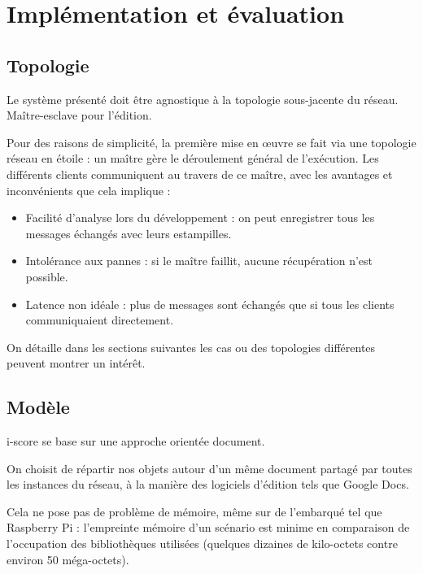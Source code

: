 \documentclass{article}
\begin{document}


\section{Implémentation et évaluation}\label{sec.evaluation}

\subsection{Topologie}
Le système présenté doit être agnostique à la topologie sous-jacente du réseau.
Maître-esclave pour l'édition.

Pour des raisons de simplicité, la première mise en œuvre se fait via une topologie réseau en étoile : un maître gère le déroulement général de l'exécution. 
Les différents clients communiquent au travers de ce maître, avec les avantages et inconvénients que cela implique : 
\begin{itemize}
    \item Facilité d'analyse lors du développement : on peut enregistrer tous les messages échangés avec leurs estampilles.
    \item Intolérance aux pannes : si le maître faillit, aucune récupération n'est possible.
    \item Latence non idéale : plus de messages sont échangés que si tous les clients communiquaient directement.
\end{itemize}

On détaille dans les sections suivantes les cas ou des topologies différentes peuvent montrer un intérêt.



\subsection{Modèle}
i-score se base sur une approche orientée document.

On choisit de répartir nos objets autour d'un même document partagé par toutes les instances du réseau, 
à la manière des logiciels d'édition tels que Google Docs. %

Cela ne pose pas de problème de mémoire, même sur de l'embarqué tel que Raspberry Pi : l'empreinte mémoire d'un scénario est minime en comparaison de l'occupation des bibliothèques utilisées (quelques dizaines de kilo-octets contre environ 50 méga-octets).
\end{document}
